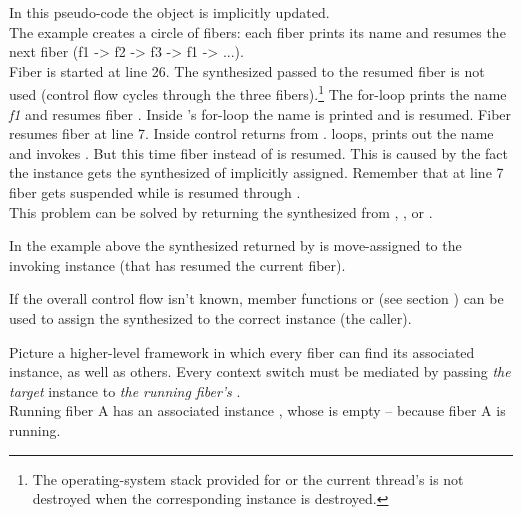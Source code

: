 In this pseudo-code the \fiber object is implicitly updated.\\
The example creates a circle of fibers: each fiber prints its name and resumes
the next fiber (f1 -> f2 -> f3 -> f1 -> ...).\\
Fiber  is started at line 26. The synthesized \fiber\xspace {} passed 
to the resumed fiber is not used (control flow cycles through the three
fibers).\footnote{The operating-system stack provided for \main or the current
thread's \entryfn is not destroyed when the corresponding \fiber instance is
destroyed.}
The for-loop prints the name \emph{f1} and resumes fiber . Inside 
's for-loop the name is printed and  is resumed. Fiber 
resumes fiber  at line 7. Inside  control returns from
.  loops, prints out the name and invokes . But
this time fiber  instead of  is resumed. This is caused by the
fact the instance  gets the synthesized \fiber of  implicitly
assigned. Remember that at line 7 fiber  gets suspended while 
is resumed through .\\

This problem can be solved by returning the synthesized \fiber from \resume,
\resumewith, \xtresume or \xtresumewith.

In the example above the synthesized \fiber returned by \resume is
move-assigned to the invoking \fiber instance (that has resumed the current
fiber).\\

\xspace\newline

If the overall control flow isn't known, member functions \resumewith
or \xtresumewith (see section ) can be used to assign the
synthesized \fiber to the correct \fiber instance (the caller).

Picture a higher-level framework in which every fiber can find its associated
 instance, as well as others. Every context switch must be mediated by
passing \emph{the target}  instance to \emph{the running fiber's}
.\\

Running fiber A has an associated  instance ,
whose \fiber {} is empty -- because fiber A is running.\\

